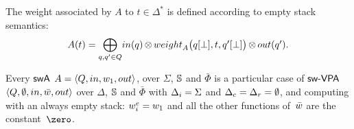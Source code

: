 %

\noindent
The weight associated by $A$ to $t \in \Delta^*$
is defined according to empty stack semantics:
%
\begin{equation}
A(t)  =
{\displaystyle\bigoplus_{q, q' \in Q}} \textstyle
\mathsf{in}(q) \mathop{\otimes}
\weight_A\bigl(\config{q}{\bot}, t, \config{q'}{\bot}\bigr)
\mathop{\otimes} \mathsf{out}(q').
\label{eq:SWVPA-value}
\end{equation}

\noindent
Every $\textsf{swA}$ $A = \< Q, \init, {\wei_1}, \final >$,
over $\Sigma$, $\mathbb{S}$ and $\bar\Phi$
is a particular case of $\textsf{sw-VPA}$
$\< Q, \emptyset, \init, \bar\wei, \final >$
over $\Delta$, $\mathbb{S}$ and $\bar\Phi$
with $\Deltai = \Sigma$ and $\Deltac = \Deltar = \emptyset$,
and computing with an always empty stack:
$\weiei = \wei_1$ and all the other functions
of~$\bar\wei$ are the constant~$\zero$.

